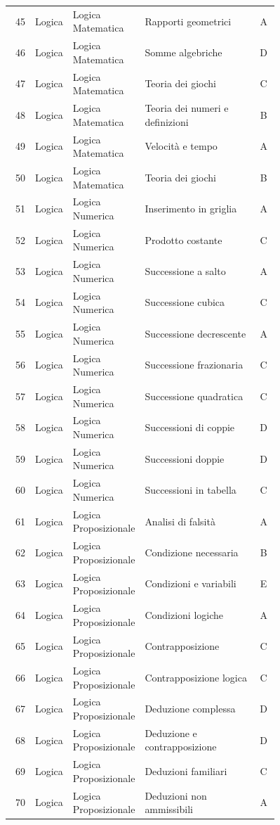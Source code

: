 \documentclass[20pt, a4paper]{article}
\begin{document}
\begin{longtable}{@{}r>{\raggedright\arraybackslash}p{0.14\linewidth}>{\raggedright\arraybackslash}p{0.20\linewidth}>{\raggedright\arraybackslash}p{0.42\linewidth}c@{}}
45 & Logica & Logica Matematica & Rapporti geometrici & A \\
46 & Logica & Logica Matematica & Somme algebriche & D \\
47 & Logica & Logica Matematica & Teoria dei giochi & C \\
48 & Logica & Logica Matematica & Teoria dei numeri e definizioni & B \\
49 & Logica & Logica Matematica & Velocità e tempo & A \\
50 & Logica & Logica Matematica & Teoria dei giochi & B \\
51 & Logica & Logica Numerica & Inserimento in griglia & A \\
52 & Logica & Logica Numerica & Prodotto costante & C \\
53 & Logica & Logica Numerica & Successione a salto & A \\
54 & Logica & Logica Numerica & Successione cubica & C \\
55 & Logica & Logica Numerica & Successione decrescente & A \\
56 & Logica & Logica Numerica & Successione frazionaria & C \\
57 & Logica & Logica Numerica & Successione quadratica & C \\
58 & Logica & Logica Numerica & Successioni di coppie & D \\
59 & Logica & Logica Numerica & Successioni doppie & D \\
60 & Logica & Logica Numerica & Successioni in tabella & C \\
61 & Logica & Logica Proposizionale & Analisi di falsità & A \\
62 & Logica & Logica Proposizionale & Condizione necessaria & B \\
63 & Logica & Logica Proposizionale & Condizioni e variabili & E \\
64 & Logica & Logica Proposizionale & Condizioni logiche & A \\
65 & Logica & Logica Proposizionale & Contrapposizione & C \\
66 & Logica & Logica Proposizionale & Contrapposizione logica & C \\
67 & Logica & Logica Proposizionale & Deduzione complessa & D \\
68 & Logica & Logica Proposizionale & Deduzione e contrapposizione & D \\
69 & Logica & Logica Proposizionale & Deduzioni familiari & C \\
70 & Logica & Logica Proposizionale & Deduzioni non ammissibili & A \\

\end{longtable}
\end{document}
